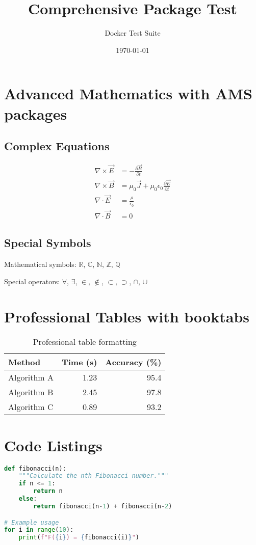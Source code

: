 \documentclass{article}
\title{Comprehensive Package Test}
\author{Docker Test Suite}
\date{\today}
\begin{document}
\maketitle

\section{Advanced Mathematics with AMS packages}

\subsection{Complex Equations}
\begin{align}
\nabla \times \vec{E} &= -\frac{\partial \vec{B}}{\partial t} \\
\nabla \times \vec{B} &= \mu_0\vec{J} + \mu_0\epsilon_0\frac{\partial \vec{E}}{\partial t} \\
\nabla \cdot \vec{E} &= \frac{\rho}{\epsilon_0} \\
\nabla \cdot \vec{B} &= 0
\end{align}

\subsection{Special Symbols}
Mathematical symbols: $\mathbb{R}$, $\mathbb{C}$, $\mathbb{N}$, $\mathbb{Z}$, $\mathbb{Q}$

Special operators: $\forall$, $\exists$, $\in$, $\notin$, $\subset$, $\supset$, $\cap$, $\cup$

\section{Professional Tables with booktabs}
\begin{table}[h]
\centering
\caption{Professional table formatting}
\begin{tabular}{lrr}
\toprule
Method & \multicolumn{1}{c}{Time (s)} & \multicolumn{1}{c}{Accuracy (\%)} \\
\midrule
Algorithm A & 1.23 & 95.4 \\
Algorithm B & 2.45 & 97.8 \\
Algorithm C & 0.89 & 93.2 \\
\bottomrule
\end{tabular}
\end{table}

\section{Code Listings}
\begin{lstlisting}[language=Python, caption=Python code example]
def fibonacci(n):
    """Calculate the nth Fibonacci number."""
    if n <= 1:
        return n
    else:
        return fibonacci(n-1) + fibonacci(n-2)

# Example usage
for i in range(10):
    print(f"F({i}) = {fibonacci(i)}")
\end{lstlisting}
\end{document}
